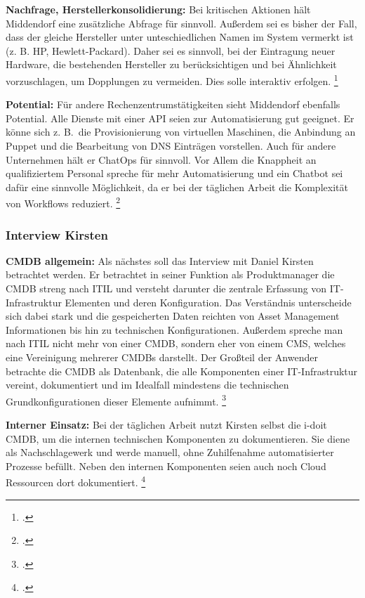 \textbf{Nachfrage, Herstellerkonsolidierung: }Bei kritischen Aktionen hält Middendorf eine zusätzliche Abfrage für sinnvoll. Außerdem sei es bisher der Fall, dass der gleiche Hersteller unter unteschiedlichen Namen im System vermerkt ist (z. B. HP, Hewlett-Packard). Daher sei es sinnvoll, bei der Eintragung neuer Hardware, die bestehenden Hersteller zu berücksichtigen und bei Ähnlichkeit vorzuschlagen, um Dopplungen zu vermeiden. Dies solle interaktiv erfolgen.
\footcite[Vgl.][o. \pno]{Midd_2019}

\textbf{Potential: }Für andere Rechenzentrumstätigkeiten sieht Middendorf ebenfalls Potential. Alle Dienste mit einer API seien zur Automatisierung gut geeignet. Er könne sich z. B.~die Provisionierung von virtuellen Maschinen, die Anbindung an Puppet und die Bearbeitung von DNS Einträgen vorstellen. Auch für andere Unternehmen hält er ChatOps für sinnvoll. Vor Allem die Knappheit an qualifiziertem Personal spreche für mehr Automatisierung und ein Chatbot sei dafür eine sinnvolle Möglichkeit, da er bei der täglichen Arbeit die Komplexität von Workflows reduziert.
\footcite[Vgl.][o. \pno]{Midd_2019}



\subsubsection{Interview Kirsten}
\textbf{CMDB allgemein: }Als nächstes soll das Interview mit Daniel Kirsten betrachtet werden. Er betrachtet in seiner Funktion als Produktmanager die \acs{CMDB} streng nach \acs{ITIL} und versteht darunter die zentrale Erfassung von IT-Infrastruktur Elementen und deren Konfiguration. Das Verständnis unterscheide sich dabei stark und die gespeicherten Daten reichten von Asset Management Informationen bis hin zu technischen Konfigurationen. Außerdem spreche man nach \acs{ITIL} nicht mehr von einer \acs{CMDB}, sondern eher von einem \acf{CMS}, welches eine Vereinigung mehrerer \acsp{CMDB} darstellt. Der Großteil der Anwender betrachte die \acs{CMDB} als Datenbank, die \glqq{}alle Komponenten einer IT-Infrastruktur vereint, dokumentiert und im Idealfall mindestens die technischen Grundkonfigurationen dieser Elemente aufnimmt.\grqq 
\footcites[][o. \pno]{Kirsten_2019}[Vgl.][o. \pno]{Kirsten_2019}

\textbf{Interner Einsatz: }Bei der täglichen Arbeit nutzt Kirsten selbst die i-doit \acs{CMDB}, um die internen technischen Komponenten zu dokumentieren. Sie diene als Nachschlagewerk und werde manuell, ohne Zuhilfenahme automatisierter Prozesse befüllt. Neben den internen Komponenten seien auch noch Cloud Ressourcen dort dokumentiert. 
\footcite[Vgl.][o. \pno]{Kirsten_2019}

